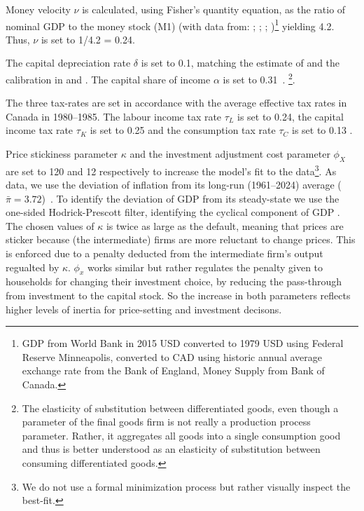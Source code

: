 \documentclass[12pt]{article}
\begin{document}
Money velocity $\nu$ is calculated, using Fisher's quantity equation, as the ratio of nominal GDP to the money stock (M1) (with data from: \textcite{bankofenglandCanadianDollarData2021}; 
\textcite{federalreservebankofminneapolisInflationCalculatorFederal}; \textcite{worldbankgroupWorldBankNational}; \textcite{bankofcanadaSelectedMonetaryAggregates})\footnote{GDP from World Bank in 2015 USD converted to 1979 USD using Federal Reserve Minneapolis, converted to CAD using historic annual average exchange rate from 
the Bank of England, Money Supply from Bank of Canada.} yielding 4.2. Thus, $\nu$ is set to 1/4.2 = 0.24. 

The capital depreciation rate $\delta$ is set to 0.1, matching the estimate of \textcite{statisticscanadaDepreciationRatesProductivity2007} and the calibration in \textcite{someOilDemandSupply2023} and \textcite{corriganToTEMIIIBank2021}.
The capital share of income $\alpha$ is set to 0.31~\parencite{fredst.louisShareLabourCompensation2021,feenstraNextGenerationPenn2015}. 
\footnote{The elasticity of substitution between differentiated goods, even though a parameter of the final goods firm is not really a production process parameter. 
Rather, it aggregates all goods into a single consumption good and thus is better understood as an elasticity of substitution between consuming differentiated goods.}. 

The three tax-rates are set in accordance with the average effective tax rates in Canada in 1980--1985. The labour income tax rate $\tau_L$ is set to 0.24, the capital income tax rate $\tau_K$ is set to 0.25 and the consumption tax rate $\tau_C$ is set to 0.13
\parencite{careyAverageEffectiveTax2000}. 

Price stickiness parameter $\kappa$ and the investment adjustment cost parameter $\phi_X$ are set to 120 and 12 respectively to increase the model's fit to the data\footnote{ We do not use a formal minimization process but rather visually inspect the best-fit.}. As data, we use the deviation of inflation from its long-run (1961--2024) average ($\bar{\pi} =  3.72$)~\parencite{worldbank_inflation_ca}. To identify the deviation of GDP from its steady-state we use the one-sided Hodrick-Prescott filter, identifying the cyclical component of GDP \parencite{fred_gdp_per_capita_ca}. The chosen values of $\kappa$ is twice as large as the default, meaning that prices are sticker because (the intermediate) firms are more reluctant to change prices. This is enforced due to a penalty deducted from the intermediate firm's output regualted by $\kappa$. $\phi_x$ works similar but rather regulates the penalty given to households for changing their investment choice, by reducing the pass-through from investment to the capital stock. So the increase in both parameters reflects higher levels of inertia for price-setting and investment decisons. 
\end{document}
